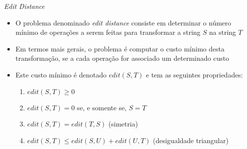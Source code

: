 \begin{frame}[fragile]{\it Edit Distance}

    \begin{itemize}
        \item O problema denominado \textit{edit distance} consiste em determinar o número mínimo 
            de operações a serem feitas para transformar a string $S$ na string $T$
        \pause

        \item Em termos mais gerais, o problema é computar o custo mínimo desta transformação, se a cada operação for 
            associado um determinado custo
        \pause

        \item Este custo mínimo é denotado $edit(S, T)$ e tem as seguintes propriedades:
        \begin{enumerate}
            \item $edit(S, T)\geq 0$
            \item $edit(S, T) = 0$ se, e somente se, $S = T$
            \item $edit(S, T) = edit(T, S)$ (simetria)
            \item $edit(S, T) \leq edit(S, U) + edit(U, T)$ (desigualdade triangular)
        \end{enumerate}
    \end{itemize}

\end{frame}

